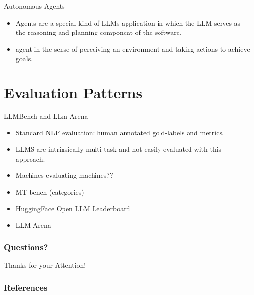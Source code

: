 \documentclass[handout]{beamer}
\begin{document}
\begin{frame}{Autonomous Agents}
\begin{scriptsize}
\begin{itemize}
\item Agents are a special kind of LLMs application in which the LLM serves as the reasoning and planning component of the software.
\item agent in the sense of perceiving an environment and taking actions to achieve goals. 
\end{itemize}
\end{scriptsize}
\end{frame}




\section{Evaluation Patterns}
\begin{frame}{LLMBench and LLm Arena}
\begin{scriptsize}
\begin{itemize}
\item Standard NLP evaluation: human annotated gold-labels and metrics.
\item LLMS are intrinsically multi-task and not easily evaluated with this approach.
\item Machines evaluating machines??
\item MT-bench (categories)
\item HuggingFace Open LLM Leaderboard
\item LLM Arena
\end{itemize}
\end{scriptsize}
\end{frame}

\begin{frame}
\frametitle{Questions?}
\begin{center}\LARGE Thanks for your Attention!\\ \end{center}



\end{frame}

\begin{frame}[allowframebreaks]\scriptsize
\frametitle{References}


%
\end{frame}  


\end{document}
